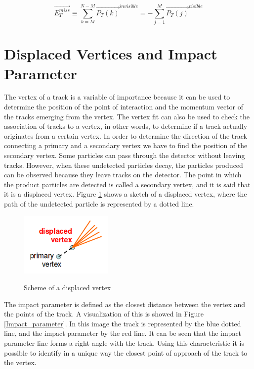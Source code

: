  \begin{equation}
  \vec{E_T^{miss}} \equiv \sum_{k=M}^{N-M}\vec{P_T(k)}^{invisible} = - \sum_{j=1}^M  \vec{P_T(j)}^{visible}
 \end{equation}

 
 \section{Displaced Vertices and Impact Parameter}
The vertex of a track is a variable of importance because it can be used to determine the position of the point of interaction and the momentum vector of the tracks emerging from the vertex. The 
vertex fit can also be used to check the association of tracks to a vertex, in other words, to determine if a track actually originates from a certain vertex. In order to determine the direction
of the track connecting a primary and a secondary vertex we have to find the position of the secondary vertex. Some particles can pass through the detector without leaving tracks. However,
when these undetected particles decay, the particles produced can be observed because they leave tracks on the detector. The point in which the product particles are detected is called a secondary 
vertex, and it is said that it is a displaced vertex. Figure \ref{Displaced_vertex} shows a sketch of a displaced vertex, where the path of the undetected particle is represented by a dotted line.

  
 \begin{figure}[h] 
 \centering
 \caption{Scheme of a displaced vertex}
 \includegraphics[width=0.4\textwidth]{./Capitulos/VariableDefinitions/Displaced_vertex} 
 \label{Displaced_vertex}
 \end{figure}
 
The impact parameter is defined as the closest distance between the vertex and the points of the track. A visualization of this is showed in Figure \ref{Impact_parameter}. In this image the track is represented by the blue dotted line, and the impact parameter by the red line. It can be seen that the impact parameter line forms a right angle with the track. Using this characteristic it is possible to identify in a unique way the closest point of approach of the track to the vertex.


